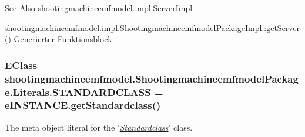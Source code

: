 \begin{DoxySeeAlso}{See Also}
\hyperlink{classshootingmachineemfmodel_1_1impl_1_1_server_impl}{shootingmachineemfmodel.\-impl.\-Server\-Impl} 

\hyperlink{classshootingmachineemfmodel_1_1impl_1_1_shootingmachineemfmodel_package_impl_acf844f025872ba16560467f31ef67236}{shootingmachineemfmodel.\-impl.\-Shootingmachineemfmodel\-Package\-Impl\-::get\-Server()} Generierter Funktionsblock 
\end{DoxySeeAlso}
\hypertarget{interfaceshootingmachineemfmodel_1_1_shootingmachineemfmodel_package_1_1_literals_a11dc8cd59d7a5eb2014c42a630a5146e}{
\subsubsection[{S\-T\-A\-N\-D\-A\-R\-D\-C\-L\-A\-S\-S}]{\setlength{\rightskip}{0pt plus 5cm}E\-Class shootingmachineemfmodel.\-Shootingmachineemfmodel\-Package.\-Literals.\-S\-T\-A\-N\-D\-A\-R\-D\-C\-L\-A\-S\-S = e\-I\-N\-S\-T\-A\-N\-C\-E.\-get\-Standardclass()}}\label{interfaceshootingmachineemfmodel_1_1_shootingmachineemfmodel_package_1_1_literals_a11dc8cd59d7a5eb2014c42a630a5146e}
The meta object literal for the '\hyperlink{classshootingmachineemfmodel_1_1impl_1_1_standardclass_impl}{{\itshape Standardclass}}' class.

